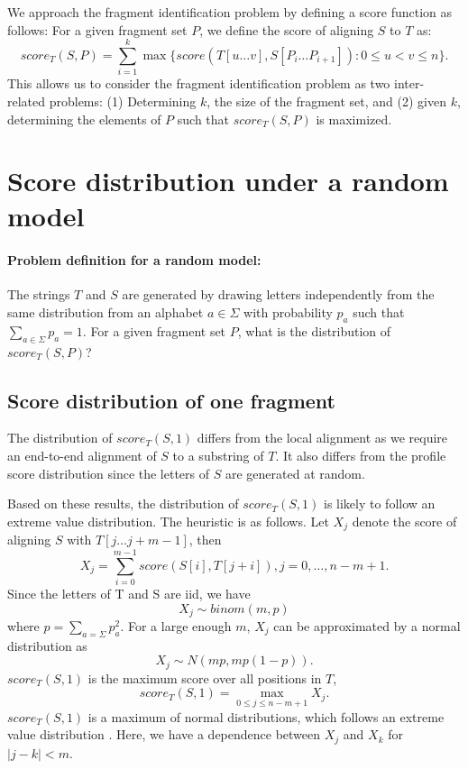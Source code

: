We approach the fragment identification problem by defining a score
function as follows:
For a given fragment set $P$, we define the score of aligning $S$ to $T$
as: \[score_T(S,P) = \sum_{i=1}^{k} \max\{score(T[u \dots v], S[P_i
\dots P_{i+1}]): 0 \leq u < v \leq n\}.\] This allows us to
consider the fragment identification problem as two inter-related
problems: (1) Determining $k$, the size of the fragment set, and (2)
given $k$, determining the elements of $P$ such that $score_T(S, P)$ is
maximized.



\section{Score distribution under a random model}
\paragraph{Problem definition for a random model:}
The strings $T$ and $S$ are generated by drawing letters independently
from the same distribution from an alphabet $a \in \Sigma$ with
probability $p_a$ such that $\sum_{a \in \Sigma} p_a = 1$.
For a given fragment set $P$, what is the distribution of $score_T(S,
P)$?


\subsection{Score distribution of one fragment}
The distribution of $score_T(S,1)$ differs from the local alignment as
we require an end-to-end alignment of $S$ to a substring of $T$. It also
differs from the profile score distribution since the letters of $S$ are
generated at random.

Based on these results, the distribution of $score_T(S,1)$ is likely to
follow an extreme value distribution. The heuristic is as follows.
Let $X_j$ denote the score of aligning $S$ with $T[j \dots j+m-1]$, then
\[X_j = \sum_{i=0}^{m-1} score(S[i],T[j+i]), j = 0, \dots, n-m+1.\]
Since the letters of T and S are iid, we have \[X_j \sim binom(m,p)\]
where \( p = \sum_{a=\Sigma} p_a^2\).  For a large enough $m$, $X_j$ can
be approximated by a normal distribution as \[X_j \sim N(mp, mp(1-p)).
\] $score_T(S,1)$ is the maximum score over all positions in $T$,
\[score_T(S,1) = \max_{0 \leq j \leq n-m+1} X_j.\] $score_T(S,1)$ is a
maximum of normal distributions, which follows an extreme value
distribution \cite{kotz2000extreme}.
Here, we have a dependence between $X_j$ and $X_k$ for $|j - k| < m$.

